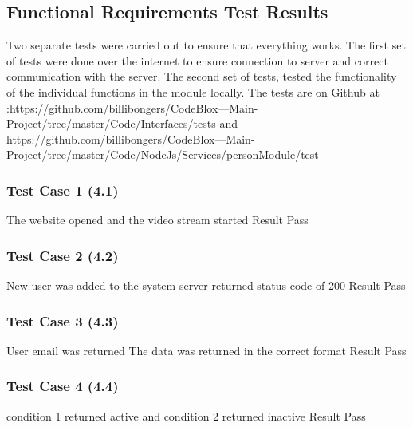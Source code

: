\documentclass[a4paper,12pt]{article}
\begin{document}
		\subsection{Functional Requirements Test Results}
		Two separate tests were carried out to ensure that everything works. The first set of tests were done over the internet to ensure connection to server and correct communication with the server. The second set of tests, tested the functionality of the individual functions in the module locally. The tests are on Github at :https://github.com/billibongers/CodeBlox---Main-Project/tree/master/Code/Interfaces/tests and https://github.com/billibongers/CodeBlox---Main-Project/tree/master/Code/NodeJs/Services/personModule/test 
		
			\subsubsection{Test Case 1 (4.1)}
			The website opened and the video stream started \newline
			Result \newline
			Pass \newline
			
			\subsubsection{Test Case 2 (4.2)}
			New user was added to the system \newline
			server returned status code of 200 \newline
			Result \newline
			Pass \newline
			
			\subsubsection{Test Case 3 (4.3)}
			User email was returned \newline
			The data was returned in the correct format \newline
			Result \newline
			Pass \newline
			
			\subsubsection{Test Case 4 (4.4)}
			condition 1 returned active and condition 2 returned inactive \newline
			Result \newline
			Pass \newline
			
\end{document}
